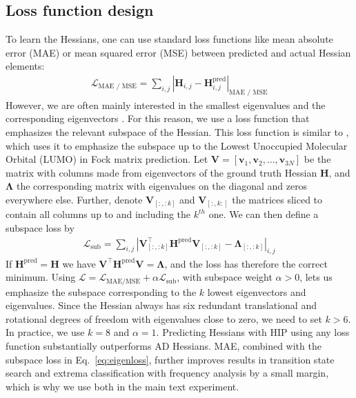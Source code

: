 \documentclass[pdflatex,sn-mathphys-num]{sn-jnl}%
\begin{document}
\subsection{Loss function design}
To learn the Hessians, one can use standard loss functions like mean absolute error (MAE) or mean squared error (MSE) between predicted and actual Hessian elements:
\begin{align}
    \mathcal{L}_\text{MAE / MSE} = \sum_{i,j} |\mathbf{H}_{i,j} - \mathbf{H}^\text{pred}_{i,j}|_\text{MAE / MSE}
\end{align}
However, we are often mainly interested in the smallest eigenvalues and the corresponding eigenvectors \citep{RSRFO1998a, cerjanFindingTransitionStates1981}. 
For this reason, we use a loss function that emphasizes the relevant subspace of the Hessian. This loss function is similar to \cite{li2025enhancing}, which uses it to emphasize the subspace up to the Lowest Unoccupied Molecular Orbital (LUMO) in Fock matrix prediction.
Let $\mathbf{V} = [\mathbf{v}_1,\mathbf{v}_2,...,\mathbf{v}_{3N}]$ be the matrix with columns made from eigenvectors of the ground truth Hessian $\mathbf{H}$, and $\mathbf{\Lambda}$ the corresponding matrix with eigenvalues on the diagonal and zeros everywhere else. Further, denote $\mathbf{V}_{[:,:k]}$ and $\mathbf{V}_{[:,k:]}$ the matrices sliced to contain all columns up to and including the $k^{th}$ one. We can then define a subspace loss by
\begin{align}
    \mathcal{L}_\text{sub} = \sum_{i,j} \left|\mathbf{V}_{[:,:k]}^\top \mathbf{H}^\text{pred}\mathbf{V}_{[:,:k]} - \mathbf{\Lambda}_{[:,:k]}\right|_{i,j} 
    \label{eq:eigenloss}
\end{align}
If $\mathbf{H}^\text{pred} = \mathbf{H}$ we have $\mathbf{V}^\top \mathbf{H}^\text{pred}\mathbf{V} = \mathbf{\Lambda}$, and the loss has therefore the correct minimum. Using $\mathcal{L}=\mathcal{L}_\text{MAE/MSE}+\alpha\mathcal{L}_\text{sub}$, with subspace weight $\alpha>0$, lets us emphasize the subspace corresponding to the $k$ lowest eigenvectors and eigenvalues. Since the Hessian always has six redundant translational and rotational degrees of freedom with eigenvalues close to zero, we need to set $k>6$. In practice, we use $k=8$ and $\alpha=1$.
% 
Predicting Hessians with HIP using any loss function substantially outperforms AD Hessians. MAE, combined with the subspace loss in Eq.~\eqref{eq:eigenloss}, further improves results in transition state search and extrema classification with frequency analysis by a small margin, which is why we use both in the main text experiment. 
\end{document}
